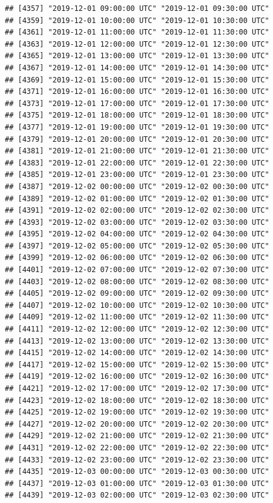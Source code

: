 \documentclass{article}\usepackage[]{graphicx}\usepackage[]{color}
\makeatletter
\newenvironment{kframe}{%
 \def\at@end@of@kframe{}%
 \ifinner\ifhmode%
  \def\at@end@of@kframe{\end{minipage}}%
  \begin{minipage}{\columnwidth}%
 \fi\fi%
 \def\FrameCommand##1{\hskip\@totalleftmargin \hskip-\fboxsep
 \colorbox{shadecolor}{##1}\hskip-\fboxsep
     \hskip-\linewidth \hskip-\@totalleftmargin \hskip\columnwidth}%
 \MakeFramed {\advance\hsize-\width
   \@totalleftmargin\z@ \linewidth\hsize
   \@setminipage}}%
 {\par\unskip\endMakeFramed%
 \at@end@of@kframe}
\newenvironment{knitrout}{}{} %
\makeatother
\begin{document}
\begin{knitrout}
\begin{kframe}
\begin{verbatim}
## [4357] "2019-12-01 09:00:00 UTC" "2019-12-01 09:30:00 UTC"
## [4359] "2019-12-01 10:00:00 UTC" "2019-12-01 10:30:00 UTC"
## [4361] "2019-12-01 11:00:00 UTC" "2019-12-01 11:30:00 UTC"
## [4363] "2019-12-01 12:00:00 UTC" "2019-12-01 12:30:00 UTC"
## [4365] "2019-12-01 13:00:00 UTC" "2019-12-01 13:30:00 UTC"
## [4367] "2019-12-01 14:00:00 UTC" "2019-12-01 14:30:00 UTC"
## [4369] "2019-12-01 15:00:00 UTC" "2019-12-01 15:30:00 UTC"
## [4371] "2019-12-01 16:00:00 UTC" "2019-12-01 16:30:00 UTC"
## [4373] "2019-12-01 17:00:00 UTC" "2019-12-01 17:30:00 UTC"
## [4375] "2019-12-01 18:00:00 UTC" "2019-12-01 18:30:00 UTC"
## [4377] "2019-12-01 19:00:00 UTC" "2019-12-01 19:30:00 UTC"
## [4379] "2019-12-01 20:00:00 UTC" "2019-12-01 20:30:00 UTC"
## [4381] "2019-12-01 21:00:00 UTC" "2019-12-01 21:30:00 UTC"
## [4383] "2019-12-01 22:00:00 UTC" "2019-12-01 22:30:00 UTC"
## [4385] "2019-12-01 23:00:00 UTC" "2019-12-01 23:30:00 UTC"
## [4387] "2019-12-02 00:00:00 UTC" "2019-12-02 00:30:00 UTC"
## [4389] "2019-12-02 01:00:00 UTC" "2019-12-02 01:30:00 UTC"
## [4391] "2019-12-02 02:00:00 UTC" "2019-12-02 02:30:00 UTC"
## [4393] "2019-12-02 03:00:00 UTC" "2019-12-02 03:30:00 UTC"
## [4395] "2019-12-02 04:00:00 UTC" "2019-12-02 04:30:00 UTC"
## [4397] "2019-12-02 05:00:00 UTC" "2019-12-02 05:30:00 UTC"
## [4399] "2019-12-02 06:00:00 UTC" "2019-12-02 06:30:00 UTC"
## [4401] "2019-12-02 07:00:00 UTC" "2019-12-02 07:30:00 UTC"
## [4403] "2019-12-02 08:00:00 UTC" "2019-12-02 08:30:00 UTC"
## [4405] "2019-12-02 09:00:00 UTC" "2019-12-02 09:30:00 UTC"
## [4407] "2019-12-02 10:00:00 UTC" "2019-12-02 10:30:00 UTC"
## [4409] "2019-12-02 11:00:00 UTC" "2019-12-02 11:30:00 UTC"
## [4411] "2019-12-02 12:00:00 UTC" "2019-12-02 12:30:00 UTC"
## [4413] "2019-12-02 13:00:00 UTC" "2019-12-02 13:30:00 UTC"
## [4415] "2019-12-02 14:00:00 UTC" "2019-12-02 14:30:00 UTC"
## [4417] "2019-12-02 15:00:00 UTC" "2019-12-02 15:30:00 UTC"
## [4419] "2019-12-02 16:00:00 UTC" "2019-12-02 16:30:00 UTC"
## [4421] "2019-12-02 17:00:00 UTC" "2019-12-02 17:30:00 UTC"
## [4423] "2019-12-02 18:00:00 UTC" "2019-12-02 18:30:00 UTC"
## [4425] "2019-12-02 19:00:00 UTC" "2019-12-02 19:30:00 UTC"
## [4427] "2019-12-02 20:00:00 UTC" "2019-12-02 20:30:00 UTC"
## [4429] "2019-12-02 21:00:00 UTC" "2019-12-02 21:30:00 UTC"
## [4431] "2019-12-02 22:00:00 UTC" "2019-12-02 22:30:00 UTC"
## [4433] "2019-12-02 23:00:00 UTC" "2019-12-02 23:30:00 UTC"
## [4435] "2019-12-03 00:00:00 UTC" "2019-12-03 00:30:00 UTC"
## [4437] "2019-12-03 01:00:00 UTC" "2019-12-03 01:30:00 UTC"
## [4439] "2019-12-03 02:00:00 UTC" "2019-12-03 02:30:00 UTC"

\end{verbatim}
\end{kframe}
\end{knitrout}
\end{document}
